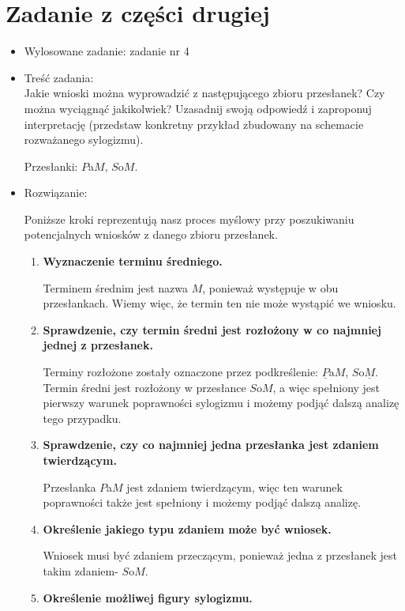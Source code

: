 \documentclass[12pt]{article}
\begin{document}
	\section{Zadanie z części drugiej}
	\begin{itemize}
		\item	Wylosowane zadanie: zadanie nr 4
		\item Treść zadania: \vspace{0.5em} \\ Jakie wnioski można wyprowadzić z następującego zbioru przesłanek? Czy można wyciągnąć
		jakikolwiek? Uzasadnij swoją odpowiedź i zaproponuj interpretację (przedstaw konkretny przykład
		zbudowany na schemacie rozważanego sylogizmu).

		
		Przesłanki: $P$a$M$, $S$o$M$.

		\item Rozwiązanie: 
		
		Poniższe kroki reprezentują nasz proces myślowy przy poszukiwaniu potencjalnych wniosków z danego zbioru przesłanek.
		\begin{enumerate}
			\item \textbf{Wyznaczenie terminu średniego.}
			
			Terminem średnim jest nazwa $M$, ponieważ występuje w obu przesłankach.
			Wiemy więc, że termin ten nie może wystąpić we wniosku.
			
			
			\item \textbf{Sprawdzenie, czy termin średni jest rozłożony w co najmniej jednej z przesłanek. }
			
			
			Terminy rozłożone zostały oznaczone przez podkreślenie:
			$\underline{P}$a$M$, $S$o$\underline{M}$.
			Termin średni jest rozłożony w przesłance $S$o$M$, a więc spełniony jest pierwszy warunek poprawności sylogizmu i możemy podjąć dalszą analizę tego przypadku.
			
			\item \textbf{Sprawdzenie, czy co najmniej jedna przesłanka jest zdaniem twierdzącym.}
			
			Przesłanka $P$a$M$ jest zdaniem twierdzącym, więc ten warunek poprawności także jest spełniony i możemy podjąć dalszą analizę.
			
			\item \textbf{Określenie jakiego typu zdaniem może być wniosek.}
			
			Wniosek musi być zdaniem przeczącym, ponieważ jedna z przesłanek jest takim zdaniem- $S$o$M$.
			
			\item \textbf{Określenie możliwej figury sylogizmu.}
			

\end{enumerate}
\end{itemize}
\end{document}

